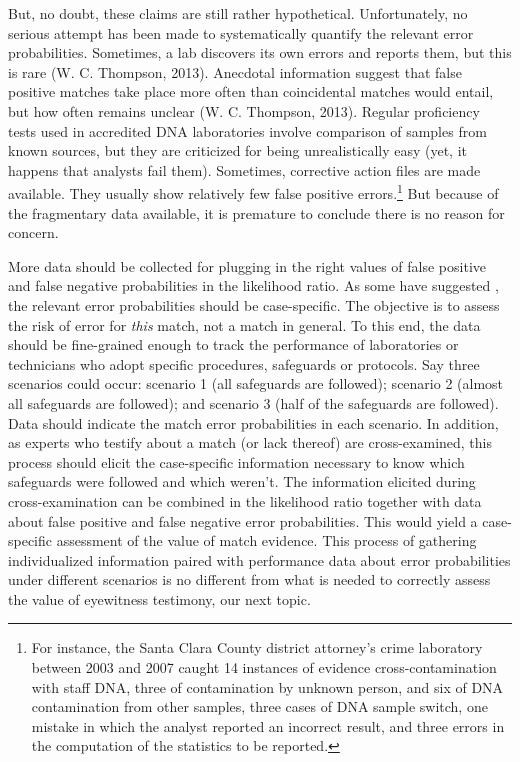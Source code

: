 \documentclass[
  10pt,
  dvipsnames,enabledeprecatedfontcommands]{scrartcl}
\begin{document}
But, no doubt, these claims are still rather hypothetical.
Unfortunately, no serious attempt has been made to systematically
quantify the relevant error probabilities. Sometimes, a lab discovers
its own errors and reports them, but this is rare (W. C. Thompson,
2013). Anecdotal information suggest that false positive matches take
place more often than coincidental matches would entail, but how often
remains unclear (W. C. Thompson, 2013). Regular proficiency tests used
in accredited DNA laboratories involve comparison of samples from known
sources, but they are criticized for being unrealistically easy (yet, it
happens that analysts fail them). Sometimes, corrective action files are
made available. They usually show relatively few false positive
errors.\footnote{For instance, the Santa Clara County district
  attorney's crime laboratory between 2003 and 2007 caught 14 instances
  of evidence cross-contamination with staff DNA, three of contamination
  by unknown person, and six of DNA contamination from other samples,
  three cases of DNA sample switch, one mistake in which the analyst
  reported an incorrect result, and three errors in the computation of
  the statistics to be reported.} But because of the fragmentary data
available, it is premature to conclude there is no reason for concern.

More data should be collected for plugging in the right values of false
positive and false negative probabilities in the likelihood ratio. As
some have suggested , the relevant error
probabilities should be case-specific. The objective is to assess the
risk of error for \textit{this} match, not a match in general. To this
end, the data should be fine-grained enough to track the performance of
laboratories or technicians who adopt specific procedures, safeguards or
protocols. Say three scenarios could occur: scenario 1 (all safeguards
are followed); scenario 2 (almost all safeguards are followed); and
scenario 3 (half of the safeguards are followed). Data should indicate
the match error probabilities in each scenario. In addition, as experts
who testify about a match (or lack thereof) are cross-examined, this
process should elicit the case-specific information necessary to know
which safeguards were followed and which weren't. The information
elicited during cross-examination can be combined in the likelihood
ratio together with data about false positive and false negative error
probabilities. This would yield a case-specific assessment of the value
of match evidence. This process of gathering individualized information
paired with performance data about error probabilities under different
scenarios is no different from what is needed to correctly assess the
value of eyewitness testimony, our next topic.
\end{document}
